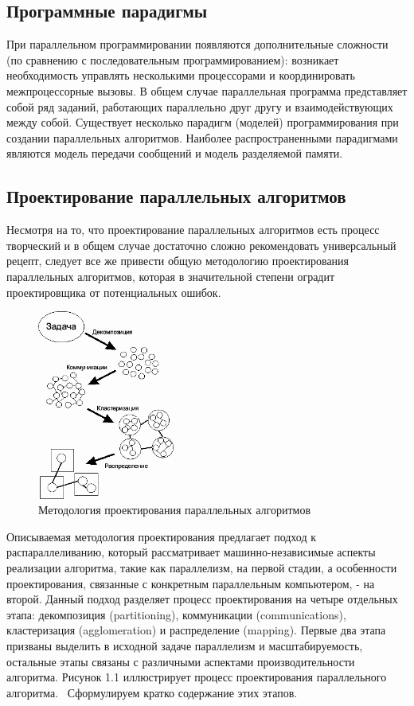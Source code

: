 \subsection{Программные парадигмы}

При параллельном программировании появляются дополнительные сложности (по сравнению с последовательным программированием): возникает необходимость управлять несколькими процессорами и координировать межпроцессорные вызовы. В общем случае параллельная программа представляет собой ряд заданий, работающих параллельно друг другу и взаимодействующих между собой. Существует несколько парадигм (моделей) программирования при создании параллельных алгоритмов. Наиболее распространенными парадигмами являются модель передачи сообщений и модель разделяемой памяти.


\subsection{Проектирование параллельных алгоритмов}
Несмотря на то, что проектирование параллельных алгоритмов есть процесс творческий и в общем случае достаточно сложно рекомендовать универсальный рецепт, следует все же привести общую методологию проектирования параллельных алгоритмов, которая в значительной степени оградит проектировщика от потенциальных ошибок.

\begin{figure}[h!]
	\centering
	\includegraphics[width=0.4\textwidth]{img/img1.png}
	\caption{Методология проектирования параллельных алгоритмов}
	\label{fig:spire05}
\end{figure}

Описываемая методология проектирования предлагает подход к распараллеливанию, который рассматривает машинно-независимые аспекты реализации алгоритма, такие как параллелизм, на первой стадии, а особенности проектирования, связанные с конкретным параллельным компьютером, - на второй. Данный подход разделяет процесс проектирования на четыре отдельных этапа: декомпозиция (partitioning), коммуникации (communications), кластеризация (agglomeration) и распределение (mapping). Первые два этапа призваны выделить в исходной задаче параллелизм и масштабируемость, остальные этапы связаны с различными аспектами производительности алгоритма. Рисунок 1.1 иллюстрирует процесс проектирования параллельного алгоритма.  
Сформулируем кратко содержание этих этапов. 
